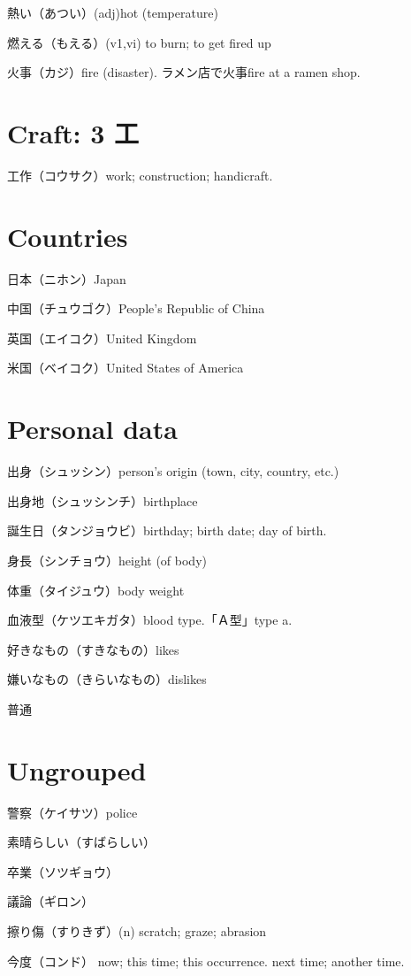 熱い（あつい）(adj)hot (temperature)

燃える（もえる）(v1,vi) to burn; to get fired up

火事（カジ）fire (disaster).
ラメン店で火事fire at a ramen shop.

\section{Craft: 3 工}

工作（コウサク）work; construction; handicraft.

\section{Countries}

日本（ニホン）Japan

中国（チュウゴク）People's Republic of China

英国（エイコク）United Kingdom

米国（ベイコク）United States of America

\section{Personal data}

出身（シュッシン）person's origin (town, city, country, etc.)

出身地（シュッシンチ）birthplace

誕生日（タンジョウビ）birthday; birth date; day of birth.

身長（シンチョウ）height (of body)

体重（タイジュウ）body weight

血液型（ケツエキガタ）blood type.「Ａ型」type a.

好きなもの（すきなもの）likes

嫌いなもの（きらいなもの）dislikes

普通

\section{Ungrouped}

警察（ケイサツ）police

素晴らしい（すばらしい）

卒業（ソツギョウ）

議論（ギロン）

擦り傷（すりきず）(n) scratch; graze; abrasion

今度（コンド）
now; this time; this occurrence.
next time; another time.

